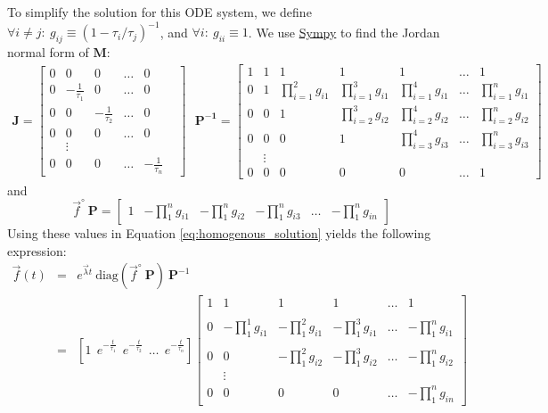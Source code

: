 \documentclass{article}
\newcommand{\finit}{\ensuremath{\vec{f}^\circ}}
\begin{document}
To simplify the solution for this ODE system, we define $\forall i \neq j:~g_{ij} \equiv (1 - \tau_i/\tau_j)^{-1}$, and $\forall i:~g_{ii} \equiv 1$. We use \href{https://www.sympy.org/}{Sympy} to find the Jordan normal form of $\mathbf{M}$:
\begin{eqnarray}
\mathbf{J} =
  \begin{bmatrix}
    0 & 0 & 0 & \ldots & 0 \\
    0 & -\frac{1}{\tau_1} & 0 & \ldots & 0 \\
    0 & 0 & -\frac{1}{\tau_2} & \ldots & 0 \\
    0 & 0 & 0 & \ldots & 0 \\
     & \vdots & & & & \\
    0 & 0 & 0 & \ldots & -\frac{1}{\tau_n}
\end{bmatrix}
~~~
\mathbf{P^{-1}} =
\begin{bmatrix}
1 & 1 & 1 & 1 & 1 & \ldots & 1 \\
0 & 1 & \prod_{i=1}^2 g_{i1} & \prod_{i=1}^3 g_{i1} & \prod_{i=1}^4 g_{i1} & \ldots & \prod_{i=1}^n g_{i1} \\
0 & 0 & 1 & \prod_{i=2}^3 g_{i2} & \prod_{i=2}^4 g_{i2} & \ldots & \prod_{i=2}^n g_{i2} \\
0 & 0 & 0 & 1 & \prod_{i=3}^4 g_{i3} & \ldots & \prod_{i=3}^n g_{i3} \\
& \vdots & & & & & \\
0 & 0 & 0 & 0 & 0 & \ldots & 1
\end{bmatrix}
\end{eqnarray}
and
\begin{equation}
	\finit~\mathbf{P} = 
	\begin{bmatrix} 
		1 & 
		-\prod_1^n g_{i1} & 
		-\prod_1^n g_{i2} & 
		-\prod_1^n g_{i3} & 
		\ldots & 
		-\prod_1^n g_{in}
	\end{bmatrix}
\end{equation}
Using these values in Equation \ref{eq:homogenous_solution} yields the following expression:
\begin{eqnarray}
	\vec{f}(t) &=& e^{\vec{\lambda} t} ~ \text{diag}\left(\finit~\mathbf{P}\right) ~ \mathbf{P}^{-1} \nonumber\\
	&=&
	\left[ 1 ~~ e^{-\frac{t}{\tau_1}} ~~ e^{-\frac{t}{\tau_2}} ~~ \ldots ~~ e^{-\frac{t}{\tau_n}}\right]
    \begin{bmatrix}
        1 & 1 & 1 & 1 & \ldots & 1 \\ \\
        0 & -\prod_1^1 g_{i1} & -\prod_1^2 g_{i1} & -\prod_1^3 g_{i1}  & \ldots & -\prod_1^n g_{i1} \\ \\
        0 & 0 & -\prod_1^2 g_{i2} & -\prod_1^3 g_{i2} & \ldots & -\prod_1^n g_{i2} \\
         & \vdots & & & & \\
        0 & 0 & 0 & 0 & \ldots & -\prod_1^n g_{in}
    \end{bmatrix}\label{eq:lin_path_solution}
\end{eqnarray}
\end{document}
